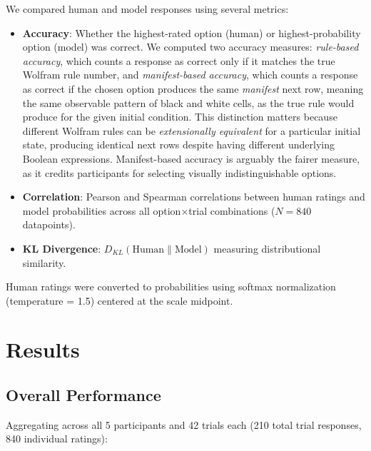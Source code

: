 \documentclass[10pt,letterpaper]{article}
\begin{document}
We compared human and model responses using several metrics:
\begin{itemize}
    \item \textbf{Accuracy}: Whether the highest-rated option (human) or highest-probability option (model) was correct. We computed two accuracy measures: \textit{rule-based accuracy}, which counts a response as correct only if it matches the true Wolfram rule number, and \textit{manifest-based accuracy}, which counts a response as correct if the chosen option produces the same \textit{manifest} next row, meaning the same observable pattern of black and white cells, as the true rule would produce for the given initial condition. This distinction matters because different Wolfram rules can be \textit{extensionally equivalent} for a particular initial state, producing identical next rows despite having different underlying Boolean expressions. Manifest-based accuracy is arguably the fairer measure, as it credits participants for selecting visually indistinguishable options.
    \item \textbf{Correlation}: Pearson and Spearman correlations between human ratings and model probabilities across all option$\times$trial combinations ($N = 840$ datapoints).
    \item \textbf{KL Divergence}: $D_{KL}(\text{Human} \| \text{Model})$ measuring distributional similarity.
\end{itemize}

Human ratings were converted to probabilities using softmax normalization (temperature = 1.5) centered at the scale midpoint.


\section{Results}

\subsection{Overall Performance}

Aggregating across all 5 participants and 42 trials each (210 total trial responses, 840 individual ratings):
\end{document}

